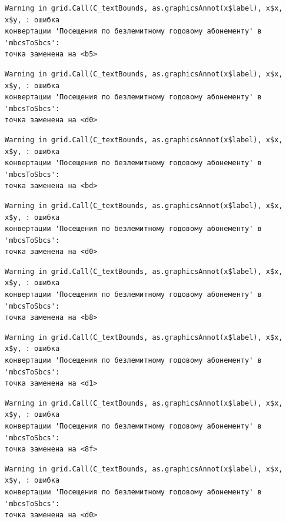 \documentclass[
  letterpaper,
  DIV=11,
  numbers=noendperiod]{scrreprt}
\begin{document}
\begin{verbatim}
Warning in grid.Call(C_textBounds, as.graphicsAnnot(x$label), x$x, x$y, : ошибка
конвертации 'Посещения по безлемитному годовому абонементу' в 'mbcsToSbcs':
точка заменена на <b5>
\end{verbatim}

\begin{verbatim}
Warning in grid.Call(C_textBounds, as.graphicsAnnot(x$label), x$x, x$y, : ошибка
конвертации 'Посещения по безлемитному годовому абонементу' в 'mbcsToSbcs':
точка заменена на <d0>
\end{verbatim}

\begin{verbatim}
Warning in grid.Call(C_textBounds, as.graphicsAnnot(x$label), x$x, x$y, : ошибка
конвертации 'Посещения по безлемитному годовому абонементу' в 'mbcsToSbcs':
точка заменена на <bd>
\end{verbatim}

\begin{verbatim}
Warning in grid.Call(C_textBounds, as.graphicsAnnot(x$label), x$x, x$y, : ошибка
конвертации 'Посещения по безлемитному годовому абонементу' в 'mbcsToSbcs':
точка заменена на <d0>
\end{verbatim}

\begin{verbatim}
Warning in grid.Call(C_textBounds, as.graphicsAnnot(x$label), x$x, x$y, : ошибка
конвертации 'Посещения по безлемитному годовому абонементу' в 'mbcsToSbcs':
точка заменена на <b8>
\end{verbatim}

\begin{verbatim}
Warning in grid.Call(C_textBounds, as.graphicsAnnot(x$label), x$x, x$y, : ошибка
конвертации 'Посещения по безлемитному годовому абонементу' в 'mbcsToSbcs':
точка заменена на <d1>
\end{verbatim}

\begin{verbatim}
Warning in grid.Call(C_textBounds, as.graphicsAnnot(x$label), x$x, x$y, : ошибка
конвертации 'Посещения по безлемитному годовому абонементу' в 'mbcsToSbcs':
точка заменена на <8f>
\end{verbatim}

\begin{verbatim}
Warning in grid.Call(C_textBounds, as.graphicsAnnot(x$label), x$x, x$y, : ошибка
конвертации 'Посещения по безлемитному годовому абонементу' в 'mbcsToSbcs':
точка заменена на <d0>
\end{verbatim}
\end{document}
